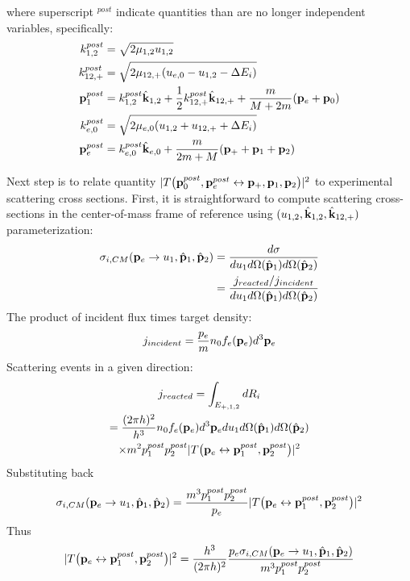 \documentclass{article}[draft]
\begin{document}
where superscript $^{post}$ indicate quantities than are no longer independent variables, specifically:
\begin{align*}
k^{post}_{1,2} &= \sqrt{ 2 \mu_{1,2} u_{1,2}} \\
k^{post}_{12,+} &= \sqrt{ 2 \mu_{12,+} (u_{e,0} - u_{1,2} - \Delta E_i)} \\
\mathbf{p}^{post}_1 &= k^{post}_{1,2} \hat{\mathbf{k}}_{1,2} + \frac12 k^{post}_{12,+} \hat{\mathbf{k}}_{12,+} + \frac{m}{M+2m} (\mathbf{p}_e + \mathbf{p}_0) \\
k^{post}_{e,0} &= \sqrt{ 2 \mu_{e,0} (u_{1,2} + u_{12,+} + \Delta E_i)} \\
\mathbf{p}^{post}_e &= k^{post}_{e,0} \hat{\mathbf{k}}_{e,0} + \frac{m}{2m + M} (\mathbf{p}_+ + \mathbf{p}_1 + \mathbf{p}_2)
\end{align*}

Next step is to relate quantity $| T\of{\vect{p}_0^{post}, \vect{p}_e^{post} \leftrightarrow \vect{p}_+, \vect{p}_1, \vect{p}_2} |^2$ to experimental scattering cross sections. First, it is straightforward to compute scattering cross-sections in the center-of-mass frame of reference using $(u_{1,2}, \hat{\mathbf{k}}_{1,2}, \hat{\mathbf{k}}_{12,+})$ parameterization:
\begin{align*}
\sigma_{i,CM} \of{ \vect{p}_{e} \rightarrow u_{1}, \hat{\vect{p}}_{1}, \hat{\vect{p}}_{2}} 
&= \frac{d\sigma}{d u_{1} d\Omega\of{\hat{\vect{p}}_{1}} d\Omega\of{\hat{\vect{p}}_{2}}}
\\
&= \frac{j_{reacted}/j_{incident}}{d u_{1} d\Omega\of{\hat{\vect{p}}_{1}} d\Omega\of{\hat{\vect{p}}_{2}}}
\end{align*}
The product of incident flux times target density:
\begin{align*}
j_{incident} = \frac{p_{e}}{m} n_0 f_e\of{\vect{p}_e} d^3 \vect{p}_e 
\end{align*}
Scattering events in a given direction:
\begin{multline*}
j_{reacted} = \int_{E_{+,1,2}} d R_i
\\
= \frac{(2\pi h)^2}{h^3}
n_0 
f_e\of{\vect{p}_e} d^3 \vect{p}_e 
d u_{1} 
d\Omega\of{\hat{\vect{p}}_{1}}
d\Omega\of{\hat{\vect{p}}_{2}} 
\\
\times
m^2 p_1^{post} p_2^{post} | T\of{\vect{p}_e \leftrightarrow \vect{p}_1^{post}, \vect{p}_2^{post}} |^2
\end{multline*}
Substituting back
\begin{align*}
\sigma_{i,CM} \of{ \vect{p}_{e} \rightarrow u_{1}, \hat{\vect{p}}_{1}, \hat{\vect{p}}_{2}} 
=
\frac{m^3 p^{post}_{1}  p^{post}_{2}}{p_{e}}
| T\of{\vect{p}_e \leftrightarrow \vect{p}_1^{post}, \vect{p}_2^{post}} |^2
\end{align*}
Thus
\begin{align*}
| T\of{\vect{p}_e \leftrightarrow \vect{p}_1^{post}, \vect{p}_2^{post}} |^2
= 
\frac{h^3}{(2\pi h)^2}
\frac{ p_{e} \sigma_{i,CM} \of{ \vect{p}_{e} \rightarrow u_{1}, \hat{\vect{p}}_{1}, \hat{\vect{p}}_{2}} }
{ m^3 p^{post}_{1}  p^{post}_{2} }
\end{align*}
\end{document}
